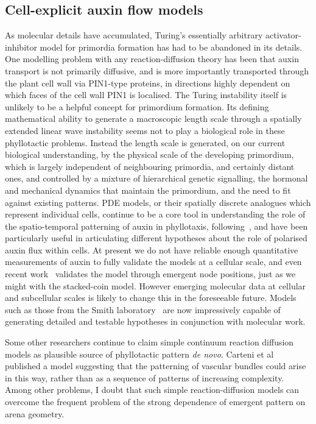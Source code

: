 \subsection{Cell-explicit auxin flow models}

As molecular details have accumulated, Turing's essentially arbitrary activator-inhibitor  model for primordia formation has had to be abandoned in its details.  One modelling problem with any reaction-diffusion theory has been that auxin transport is not primarily diffusive, and is more importantly transported through the plant cell wall via PIN1-type proteins, in directions highly dependent on which faces of the cell wall PIN1 is localised. 
The Turing instability itself  is unlikely to be a helpful concept for primordium formation. Its defining mathematical ability to generate a macroscopic length scale through a spatially extended linear wave instability seems not to play a biological role in these phyllotactic problems. Instead the length scale is generated, on our current biological understanding, by the physical scale of the developing primordium, which is largely independent of neighbouring primordia, and certainly distant ones, and controlled by a mixture of hierarchical genetic signalling,  the hormonal and mechanical dynamics that maintain the primordium, and the need to fit against existing patterns. 
PDE models, or their spatially discrete analogues which represent individual cells, continue to be a core tool in understanding the role of the spatio-temporal patterning of auxin in phyllotaxis, following~\cite{reinhardtRegulationPhyllotaxisPolar2003,smithPlausibleModelPhyllotaxis2006,jonssonAuxindrivenPolarizedTransport2006}, and have been particularly useful in articulating different hypotheses about the role of polarised auxin flux  within cells.
 At present we do not have reliable enough quantitative measurements of auxin to fully validate the models at a cellular scale, and 
 even recent work~\cite{pennybackerPhyllotaxisProgressStory2015} validates the model through emergent node positions, just as we might with the stacked-coin model. However emerging molecular data at cellular and subcellular scales is likely to change this in the foreseeable future. Models such as those from the Smith laboratory~\cite{martinezLeftRightLeaf2016,chitwoodLeafAsymmetryDevelopmental2012} are now impressively capable of generating detailed and testable hypotheses in conjunction with molecular work. 
 
Some other researchers continue to claim simple continuum reaction diffusion models as plausible source of phyllotactic pattern \textit{de novo}. Carteni et al~\autocite{carteniModellingDevelopmentArrangement2014} published a model suggesting that the patterning of vascular bundles could arise in this way, rather than as a sequence of patterns of increasing complexity. Among other problems, I doubt that such simple reaction-diffusion models can overcome the frequent problem of the strong dependence of emergent pattern on arena geometry. 

